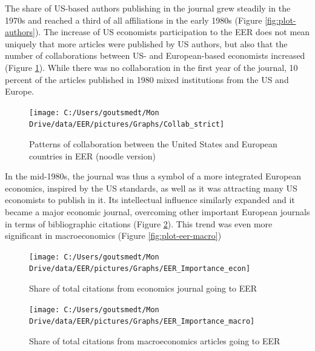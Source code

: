 \documentclass[]{elsarticle} %
\begin{document}
The share of US-based authors publishing in the journal grew steadily in
the 1970s and reached a third of all affiliations in the early 1980s
(Figure \ref{fig:plot-authors}). The increase of US economists
participation to the EER does not mean uniquely that more articles were
published by US authors, but also that the number of collaborations
between US- and European-based economists increased (Figure
\ref{fig:plot-collabs}). While there was no collaboration in the first
year of the journal, 10 percent of the articles published in 1980 mixed
institutions from the US and Europe.

\begin{figure}[h]

{\centering \texttt{[image: C:/Users/goutsmedt/Mon Drive/data/EER/pictures/Graphs/Collab\_strict]} 

}

\caption{Patterns of collaboration between the United States and European countries in EER (noodle version)}\label{fig:plot-collabs}
\end{figure}

In the mid-1980s, the journal was thus a symbol of a more integrated
European economics, inspired by the US standards, as well as it was
attracting many US economists to publish in it. Its intellectual
influence similarly expanded and it became a major economic journal,
overcoming other important European journals in terms of bibliographic
citations (Figure \ref{fig:plot-eer-importance}). This trend was even
more significant in macroeconomics (Figure \ref{fig:plot-eer-macro})

\begin{figure}[h]

{\centering \texttt{[image: C:/Users/goutsmedt/Mon Drive/data/EER/pictures/Graphs/EER\_Importance\_econ]} 

}

\caption{Share of total citations from economics journal going to EER}\label{fig:plot-eer-importance}
\end{figure}

\begin{figure}[h]

{\centering \texttt{[image: C:/Users/goutsmedt/Mon Drive/data/EER/pictures/Graphs/EER\_Importance\_macro]} 

}

\caption{Share of total citations from macroeconomics articles going to EER}\label{fig:plot-eer-importance-macro}
\end{figure}
\end{document}
